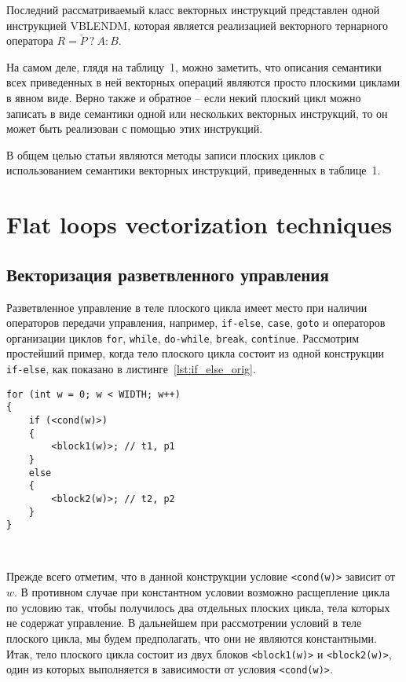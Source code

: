 \documentclass[
11pt,%
tightenlines,%
twoside,%
onecolumn,%
nofloats,%
nobibnotes,%
nofootinbib,%
superscriptaddress,%
noshowpacs,%
centertags]%
{revtex4}
\begin{document}
Последний рассматриваемый класс векторных инструкций представлен одной инструкцией VBLENDM, которая является реализацией векторного тернарного оператора $R = \check{P} \ ? \ A : B$.

На самом деле, глядя на таблицу~1, можно заметить, что описания семантики всех приведенных в ней векторных операций являются просто плоскими циклами в явном виде.
Верно также и обратное -- если некий плоский цикл можно записать в виде семантики одной или нескольких векторных инструкций, то он может быть реализован с помощью этих инструкций.

В общем целью статьи являются методы записи плоских циклов с использованием семантики векторных инструкций, приведенных в таблице~1.

\section{Flat loops vectorization techniques}

\subsection{Векторизация разветвленного управления}

Разветвленное управление в теле плоского цикла имеет место при наличии операторов передачи управления, например, \texttt{if-else}, \texttt{case}, \texttt{goto} и операторов организации циклов \texttt{for}, \texttt{while}, \texttt{do-while}, \texttt{break}, \texttt{continue}.
Рассмотрим простейший пример, когда тело плоского цикла состоит из одной конструкции \texttt{if-else}, как показано в листинге~\ref{lst:if_else_orig}.

\begin{lstlisting}[caption={Тело плоского цикла, состоящее из конструкции \texttt{if-else}.},label={lst:if_else_orig}]
for (int w = 0; w < WIDTH; w++)
{
    if (<cond(w)>)
    {
        <block1(w)>; // t1, p1
    }
    else
    {
        <block2(w)>; // t2, p2
    }
}
\end{lstlisting}

\

Прежде всего отметим, что в данной конструкции условие \texttt{<cond(w)>} зависит от $w$.
В противном случае при константном условии возможно расщепление цикла по условию так, чтобы получилось два отдельных плоских цикла, тела которых не содержат управление.
В дальнейшем при рассмотрении условий в теле плоского цикла, мы будем предполагать, что они не являются константными.
Итак, тело плоского цикла состоит из двух блоков \texttt{<block1(w)>} и \texttt{<block2(w)>}, один из которых выполняется в зависимости от условия \texttt{<cond(w)>}.
\end{document}

